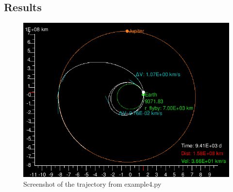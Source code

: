 \documentclass[a4paper,11pt]{article}
\begin{document}
\subsection{Results}
\begin{figure}[H]
\centering
\includegraphics[width=1\textwidth]{img/example4}
\caption{Screenshot of the trajectory from example4.py}
\label{img:example4}
\end{figure}




\end{document}
